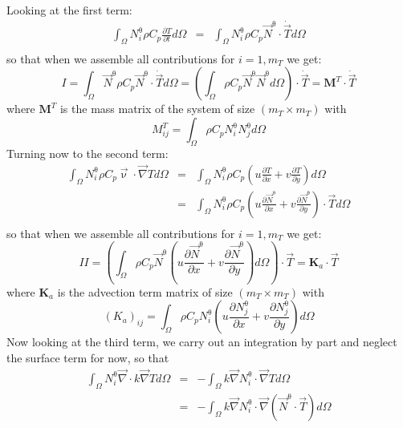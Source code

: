 Looking at the first term:
\begin{eqnarray}
\int_\Omega N^\uptheta_i  \rho C_p \frac{\partial T}{\partial t} d\Omega
&=&  \int_\Omega N^\uptheta_i  \rho C_p \vec N^\uptheta \cdot \dot{\vec T}  d\Omega \\
\end{eqnarray}
so that when we assemble all contributions for $i=1,m_T$ we get:
\begin{equation}
I 
= \int_\Omega \vec N^\uptheta  \rho C_p \vec N^\uptheta \cdot \dot{\vec T}  d\Omega
= \left( \int_\Omega \rho C_p  \vec N^\uptheta  \vec N^\uptheta  d\Omega \right) \cdot \dot{\vec T}
= {\bm M}^T \cdot \dot{\vec T}
 \end{equation}
where ${\bm M}^T$ is the mass matrix of the system of size $(m_T \times m_T)$ with 
\begin{equation}
M_{ij}^T = \int_\Omega \rho C_p N_i^\uptheta N_j^\uptheta d\Omega
\end{equation}
Turning now to the second term:
\begin{eqnarray}
\int_\Omega N^\uptheta_i  \rho C_p  {\vec \upnu}\cdot {\vec\nabla T}   d\Omega
&=& \int_\Omega N^\uptheta_i  \rho C_p (u \frac{\partial T}{\partial x} +  v \frac{\partial T}{\partial y} ) d\Omega \\
&=& \int_\Omega N^\uptheta_i  \rho C_p (u \frac{\partial \vec N^\uptheta}{\partial x} +  v \frac{\partial \vec N^\uptheta}{\partial y} ) \cdot \vec T d\Omega \\
\end{eqnarray}
so that when we assemble all contributions for $i=1,m_T$ we get:
\[
II = \left(\int_\Omega \rho C_p \vec N^\uptheta (u \frac{\partial \vec N^\uptheta}{\partial x} +  v \frac{\partial \vec N^\uptheta}{\partial y} ) d\Omega \right)  \cdot \vec T = {\bm K}_a \cdot \vec T
\]
where ${\bm K}_a$ is the advection term matrix of size $(m_T \times m_T)$ with
\[
(K_a)_{ij} = \int_\Omega \rho C_p N_i^\uptheta 
\left(u \frac{\partial N_j^\uptheta}{\partial x} +  v \frac{\partial N_j^\uptheta}{\partial y} \right) d\Omega 
\]
Now looking at the third term, we carry out an integration by part and neglect the surface term for now, so that 
\begin{eqnarray}
\int_\Omega  N^\uptheta_i {\vec \nabla} \cdot k \vec\nabla T d\Omega
&=& - \int_\Omega  k \vec \nabla N^\uptheta_i \cdot \vec\nabla T d\Omega \\
&=& - \int_\Omega  k \vec \nabla N^\uptheta_i \cdot \vec\nabla (\vec N^\uptheta \cdot \vec T) d\Omega \\
\end{eqnarray}
